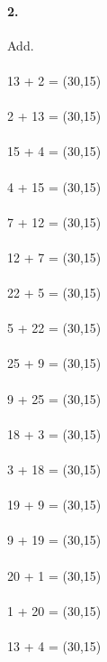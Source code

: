 \documentclass[12pt]{article}
\begin{document}
\newpage

\paragraph{2.}
Add. \\
\\
13 + 2 = \framebox(30,15){}
\\
\\
2 + 13 = \framebox(30,15){}
\\
\\
15 + 4 = \framebox(30,15){}
\\
\\
4 + 15 = \framebox(30,15){}
\\
\\
7 + 12 = \framebox(30,15){}
\\
\\
12 + 7 = \framebox(30,15){}
\\
\\
22 + 5 = \framebox(30,15){}
\\
\\
5 + 22 = \framebox(30,15){}
\\
\\
25 + 9 = \framebox(30,15){}
\\
\\
9 + 25 = \framebox(30,15){}
\\
\\
18 + 3 = \framebox(30,15){}
\\
\\
3 + 18 = \framebox(30,15){}
\\
\\
19 + 9 = \framebox(30,15){}
\\
\\
9 + 19 = \framebox(30,15){}
\\
\\
20 + 1 = \framebox(30,15){}
\\
\\
1 + 20 = \framebox(30,15){}
\\
\\
13 + 4 = \framebox(30,15){}

\newpage
\end{document}

